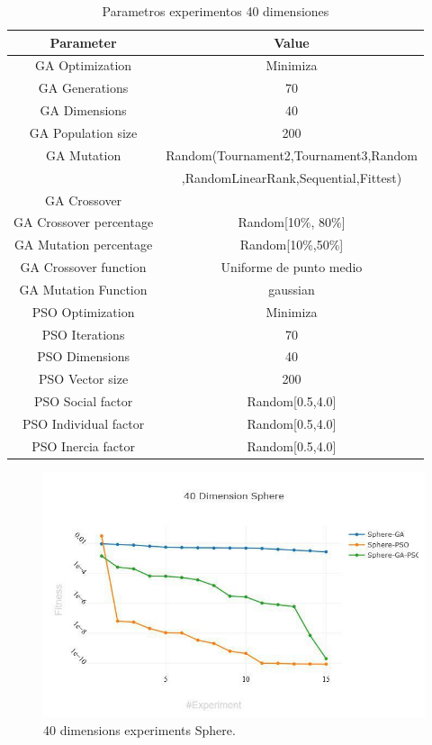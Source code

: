 \documentclass[runningheads]{llncs}
\begin{document}
    \begin{table}[htp]
      \caption{Parametros experimentos 40 dimensiones}
      \label{table:ga-pso-parameters-20}
      \centering
      \begin{tabular}{|c|c|}
      \hline
      Parameter & Value \\
      \hline
      \hline
      GA Optimization& Minimiza \\
      \hline
      GA Generations & 70 \\
      \hline
      GA Dimensions & 40 \\
      \hline
      GA Population size & 200 \\
      \hline
      GA Mutation & Random(Tournament2,Tournament3,Random \\
      &  ,RandomLinearRank,Sequential,Fittest)\\
      \hline
      GA Crossover \\
      \hline
      GA Crossover percentage & Random[10\%, 80\%] \\
      \hline
      GA Mutation percentage & Random[10\%,50\%] \\
      \hline
      GA Crossover function & Uniforme de punto medio \\
      \hline
      GA Mutation Function & gaussian \\
      \hline
      PSO Optimization & Minimiza \\
      \hline
      PSO Iterations & 70 \\
      \hline
      PSO Dimensions & 40 \\
      \hline
      PSO Vector size& 200 \\
      \hline
      PSO Social factor & Random[0.5,4.0] \\
      \hline
      PSO Individual factor & Random[0.5,4.0] \\
      \hline
      PSO Inercia factor & Random[0.5,4.0] \\
      \hline
      \end{tabular}
      \end{table}
    
      \begin{figure}[htp]
        \includegraphics[width=\textwidth]{40-sphere.jpg}
        \caption{40 dimensions experiments Sphere.} \label{fig1}
        \end{figure}
\end{document}
